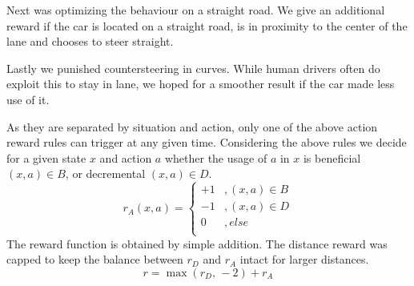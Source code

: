 Next was optimizing the behaviour on a straight road. We give an additional reward if the car is located on a straight road, is in proximity to the center of the lane and chooses to steer straight.

Lastly we punished countersteering in curves. While human drivers often do exploit this to stay in lane, we hoped for a smoother result if the car made less use of it.

As they are separated by situation and action, only one of the above action reward rules can trigger at any given time. Considering the above rules we decide for a given state $x$ and action $a$ whether the usage of $a$ in $x$ is beneficial $(x, a) \in B$, or decremental $(x, a) \in D$.
\[ r_A(x, a) = 
	\begin{cases}
		+1	&	, (x, a) \in B\\
		-1	&	, (x, a) \in D\\		
		0	&	, else\\
	\end{cases}
\]
The reward function is obtained by simple addition. The distance reward was capped to keep the balance between $r_D$ and $r_A$ intact for larger distances. 
\[ r = \max(r_D\text{, }-2) + r_A \]